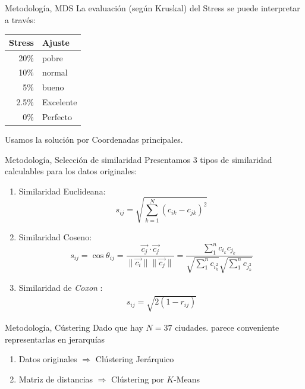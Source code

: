 \begin{frame}{Metodología, MDS}
	La evaluación (según Kruskal) del Stress se puede interpretar a través:
	\begin{center}
\begin{tabular}{r l}
Stress & Ajuste \\
\hline
20\% & pobre \\
10\% & normal \\
5\% & bueno\\
2.5\% & Excelente\\
0\% & Perfecto
\end{tabular}
\end{center}
Usamos la solución por Coordenadas principales.
\end{frame}

\begin{frame}{Metodología, Selección de similaridad}
Presentamos 3 tipos de similaridad calculables para los datos originales:
	
\begin{enumerate}
	[<+- | alert@+>]
	    \item Similaridad Euclideana:
	    $$s_{ij} = \sqrt{\sum_{k=1}^N(c_{ik}-c_{jk})^2 }$$
	    \item Similaridad Coseno:
	    $$
    s_{ij}=\operatorname{cos} \theta_{ij}=\frac{\vec{c_j} \cdot \vec{c_j}}{\|\vec{c_i}\|\|\vec{c_j}\|}=\frac{\sum_{1}^{n} c_i_{k} c_j_{k}}{\sqrt{\sum_{1}^{n} c_i_{k}^{2}} \sqrt{\sum_{1}^{n} c_j_{k}^{2}}}
    $$
    \item Similaridad de \textit{Coxon} \citep{mds_book_ref}:
    \begin{align} \label{coxon}
    s_{ij}=\sqrt{2(1-r_{ij})}
    \end{align}
    
\end{enumerate}

    
\end{frame}

\begin{frame}{Metodología, Cústering}
Dado que hay $N = 37$ ciudades. parece conveniente representarlas en jerarquías
\begin{enumerate}
	[<+- | alert@+>]
	    \item Datos originales $\Longrightarrow$ Clústering Jerárquico
	    \item Matriz de distancias $\Longrightarrow$ Clústering por $K$-Means
    
\end{enumerate}

    
\end{frame}




